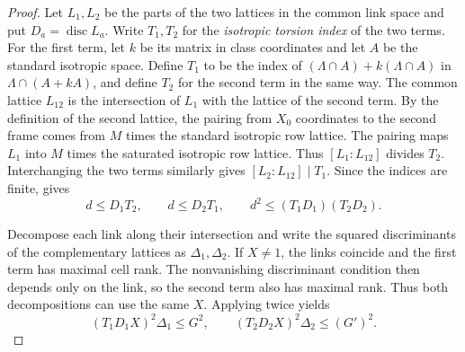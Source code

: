 \begin{proof}
Let $L_1,L_2$ be the parts of the two lattices in the common link space and put $D_a=\operatorname{disc}L_a$.
Write $T_1,T_2$ for the \emph{isotropic torsion index} of the two terms.
For the first term, let $k$ be its matrix in class coordinates and let $A$ be the standard isotropic space.
Define $T_1$ to be the index of $(\Lambda\cap A)+k(\Lambda\cap A)$ in $\Lambda\cap(A+kA)$,
and define $T_2$ for the second term in the same way.
The common lattice $L_{12}$ is the intersection of $L_1$ with the lattice of the second term.
By the definition of the second lattice, the pairing from $X_0$ coordinates to the second frame comes from $M$ times the standard isotropic row lattice.
The pairing maps $L_1$ into $M$ times the saturated isotropic row lattice.
Thus $[L_1:L_{12}]$ divides $T_2$. Interchanging the two terms similarly gives
$[L_2:L_{12}]\mid T_1$. Since the indices are finite,  gives
\[
 d\le D_1T_2,\qquad d\le D_2T_1,\qquad d^2\le (T_1D_1)(T_2D_2).
\]

Decompose each link along their intersection and write the squared discriminants of the complementary lattices as
$\Delta_1,\Delta_2$. If $X\ne1$, the links coincide and the first term has maximal cell rank.
The nonvanishing discriminant condition then depends only on the link, so the second term also has maximal rank.
Thus both decompositions can use the same $X$. Applying  twice yields
\[
 (T_1D_1X)^2\Delta_1\le G^2,\qquad
 (T_2D_2X)^2\Delta_2\le (G')^2.
\]


\end{proof}
